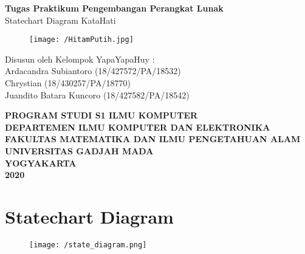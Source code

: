 \documentclass{article}
\begin{document}
	\begin{titlepage}
		\begin{center}
			
			\null
			{
				\huge \bfseries Tugas Praktikum Pengembangan Perangkat Lunak}\\
			[1cm]
			{\LARGE Statechart Diagram KataHati}\\
			
			\vspace{2cm}
			
			\begin{figure}[H]
				\centering
				\texttt{[image: /HitamPutih.jpg]}
			\end{figure}
			
			\vspace{3cm}
			
			{\Large 
				Disusun oleh Kelompok YapaYapaHuy} {\Large :\\
				\vspace{0.5cm}
				Ardacandra Subiantoro (18/427572/PA/18532)\\
				Chrystian (18/430257/PA/18770)\\
				Juandito Batara Kuncoro (18/427582/PA/18542)\\
			}
			
			
			\vspace{2cm}
			
			{\normalsize \bfseries
				PROGRAM STUDI S1 ILMU KOMPUTER\\
				DEPARTEMEN ILMU KOMPUTER DAN ELEKTRONIKA\\
				FAKULTAS MATEMATIKA DAN ILMU PENGETAHUAN ALAM\\
				UNIVERSITAS GADJAH MADA\\
				YOGYAKARTA\\
				\vspace{0.2cm}
				2020
			}
			
		\end{center}
	\end{titlepage}

	\newpage
	
	\section{Statechart Diagram}
	\begin{figure}[H]
		\centering
		\texttt{[image: /state\_diagram.png]}
	\end{figure}
\end{document}
